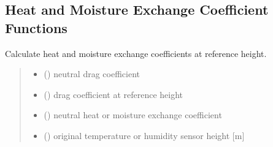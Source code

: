 \documentclass[letterpaper,10pt,english]{sphinxmanual}
\begin{document}
\subsection{Heat and Moisture Exchange Coefficient Functions}
\label{\detokenize{users_guide:module-AirSeaFluxCode.flux_subs.heat_coef}}\label{\detokenize{users_guide:heat-and-moisture-exchange-coefficient-functions}}

\begin{fulllineitems}
\label{\detokenize{users_guide:AirSeaFluxCode.flux_subs.heat_coef.ctq_calc}}
\pysigstartsignatures
{}
\pysigstopsignatures
\sphinxAtStartPar
Calculate heat and moisture exchange coefficients at reference height.
\begin{quote}\begin{description}
\begin{itemize}
\item {} 
\sphinxAtStartPar
{} () \textendash{} neutral drag coefficient

\item {} 
\sphinxAtStartPar
{} () \textendash{} drag coefficient at reference height

\item {} 
\sphinxAtStartPar
{} () \textendash{} neutral heat or moisture exchange coefficient

\item {} 
\sphinxAtStartPar
{} () \textendash{} original temperature or humidity sensor height {[}m{]}


\end{itemize}
\end{description}
\end{quote}
\end{fulllineitems}
\end{document}
